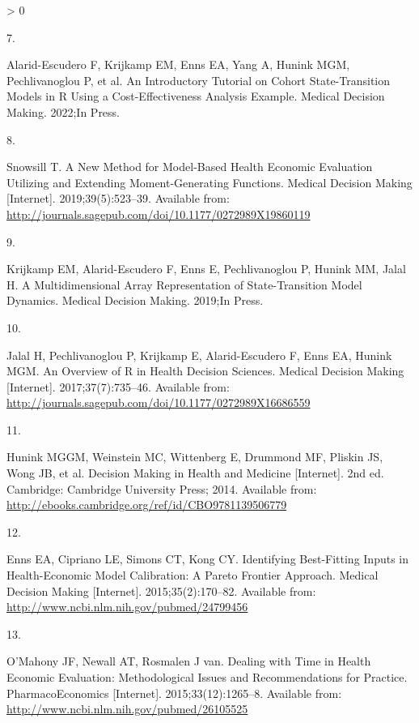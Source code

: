 \documentclass[
]{article}
\newlength{\cslhangindent}
\newlength{\csllabelwidth}
\newenvironment{CSLReferences}[2] %
 {%
  \setlength{\parindent}{0pt}
  \ifodd #1 \everypar{\setlength{\hangindent}{\cslhangindent}}\ignorespaces\fi
  \ifnum #2 > 0
  \setlength{\parskip}{#2\baselineskip}
  \fi
 }%
 {}
\newcommand{\CSLLeftMargin}[1]{\parbox[t]{\csllabelwidth}{#1}}
\newcommand{\CSLRightInline}[1]{\parbox[t]{\linewidth - \csllabelwidth}{#1}\break}
\begin{document}
\begin{CSLReferences}{0}{0}
\leavevmode\hypertarget{ref-Alarid-Escudero2022b}{}%
\CSLLeftMargin{7. }
\CSLRightInline{Alarid-Escudero F, Krijkamp EM, Enns EA, Yang A, Hunink MGM, Pechlivanoglou P, et al. {An Introductory Tutorial on Cohort State-Transition Models in R Using a Cost-Effectiveness Analysis Example}. Medical Decision Making. 2022;In Press. }

\leavevmode\hypertarget{ref-Snowsill2019}{}%
\CSLLeftMargin{8. }
\CSLRightInline{Snowsill T. {A New Method for Model-Based Health Economic Evaluation Utilizing and Extending Moment-Generating Functions}. Medical Decision Making {[}Internet{]}. 2019;39(5):523--39. Available from: \url{http://journals.sagepub.com/doi/10.1177/0272989X19860119}}

\leavevmode\hypertarget{ref-Krijkamp2019}{}%
\CSLLeftMargin{9. }
\CSLRightInline{Krijkamp EM, Alarid-Escudero F, Enns E, Pechlivanoglou P, Hunink MM, Jalal H. {A Multidimensional Array Representation of State-Transition Model Dynamics}. Medical Decision Making. 2019;In Press. }

\leavevmode\hypertarget{ref-Jalal2017b}{}%
\CSLLeftMargin{10. }
\CSLRightInline{Jalal H, Pechlivanoglou P, Krijkamp E, Alarid-Escudero F, Enns EA, Hunink MGM. {An Overview of R in Health Decision Sciences}. Medical Decision Making {[}Internet{]}. 2017;37(7):735--46. Available from: \url{http://journals.sagepub.com/doi/10.1177/0272989X16686559}}

\leavevmode\hypertarget{ref-Hunink2014}{}%
\CSLLeftMargin{11. }
\CSLRightInline{Hunink MGGM, Weinstein MC, Wittenberg E, Drummond MF, Pliskin JS, Wong JB, et al. {Decision Making in Health and Medicine} {[}Internet{]}. 2nd ed. Cambridge: Cambridge University Press; 2014. Available from: \url{http://ebooks.cambridge.org/ref/id/CBO9781139506779}}

\leavevmode\hypertarget{ref-Enns2015e}{}%
\CSLLeftMargin{12. }
\CSLRightInline{Enns EA, Cipriano LE, Simons CT, Kong CY. {Identifying Best-Fitting Inputs in Health-Economic Model Calibration: A Pareto Frontier Approach}. Medical Decision Making {[}Internet{]}. 2015;35(2):170--82. Available from: \url{http://www.ncbi.nlm.nih.gov/pubmed/24799456}}

\leavevmode\hypertarget{ref-OMahony2015}{}%
\CSLLeftMargin{13. }
\CSLRightInline{O'Mahony JF, Newall AT, Rosmalen J van. {Dealing with Time in Health Economic Evaluation: Methodological Issues and Recommendations for Practice.} PharmacoEconomics {[}Internet{]}. 2015;33(12):1265--8. Available from: \url{http://www.ncbi.nlm.nih.gov/pubmed/26105525}}


\end{CSLReferences}
\end{document}
